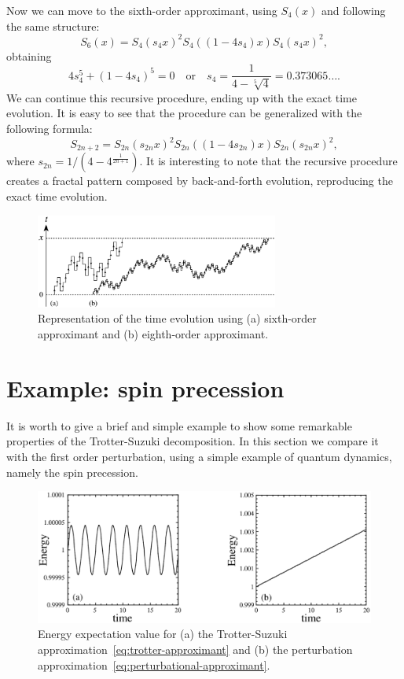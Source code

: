 Now we can move to the sixth-order approximant, using $S_4(x)$ and following the same structure:
\begin{equation} \label{eq:sixth-order}
S_6(x) = S_4(s_4x)^2 S_4((1-4s_4)x) S_4(s_4x)^2,
\end{equation}
obtaining
\begin{equation}
4s_4^5 + (1-4s_4)^5 = 0 \quad \mathrm{or} \quad s_4 = \frac{1}{4-\sqrt[5]{4}} = 0.373065\ldots .
\end{equation}
We can continue this recursive procedure, ending up with the exact time evolution. It is easy to see that the procedure can be generalized with the following formula:
\begin{equation}
S_{2n+2} = S_{2n}(s_{2n}x)^2 S_{2n}((1-4s_{2n})x) S_{2n}(s_{2n}x)^2,
\end{equation}
where $s_{2n} = 1/(4-4^{\frac{1}{2n+1}})$.
It is interesting to note that the recursive procedure creates a fractal pattern composed by back-and-forth evolution, reproducing the exact time evolution.
\begin{figure}
  \centering
   \includegraphics[width=8cm]{Plots/fractal_evolution.eps}
   \caption{Representation of the time evolution using (a) sixth-order approximant and (b) eighth-order approximant.} \label{plot:fractal-evolution}
\end{figure}

\section{Example: spin precession}
It is worth to give a brief and simple example to show some remarkable properties of the Trotter-Suzuki decomposition. In this section we compare it with the first order perturbation, using a simple example of quantum dynamics, namely the spin precession.

\begin{figure}[t]
  \centering
   \includegraphics[width=12cm]{Plots/spin_evolution.eps}
   \caption{Energy expectation value for (a) the Trotter-Suzuki approximation~\eqref{eq:trotter-approximant} and (b) the perturbation approximation~\eqref{eq:perturbational-approximant}.} \label{plot:spin-evolution}
\end{figure}

